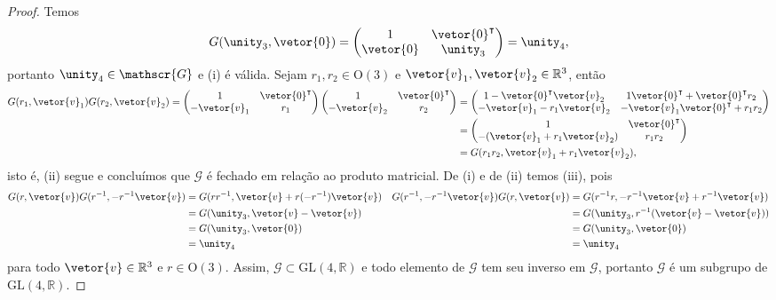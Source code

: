 \begin{proof}
    Temos
    \begin{equation*}
        G(\unity_3, \vetor{0}) = \begin{pmatrix}
            1 & \vetor{0}^\intercal\\
            \vetor{0} & \unity_3
        \end{pmatrix} = \unity_4,
    \end{equation*}
    portanto \(\unity_4 \in \mathscr{G}\) e (i) é válida. Sejam \(r_1, r_2 \in \mathrm{O}(3)\) e \(\vetor{v}_1, \vetor{v}_2 \in \mathbb{R}^3\), então
    \begin{align*}
        G(r_1, \vetor{v}_1)G(r_2, \vetor{v}_2)
        =
        \begin{pmatrix}
            1 & \vetor{0}^\intercal\\
            -\vetor{v}_1 & r_1
        \end{pmatrix}
        \begin{pmatrix}
            1 & \vetor{0}^\intercal\\
            -\vetor{v}_2 & r_2
        \end{pmatrix}
        &=
        \begin{pmatrix}
            1 - \vetor{0}^\intercal\vetor{v}_2 & 1\vetor{0}^\intercal + \vetor{0}^\intercal r_2\\
            -\vetor{v}_1 - r_1 \vetor{v}_2 & -\vetor{v}_1\vetor{0}^\intercal + r_1 r_2
        \end{pmatrix}\\
        &=
        \begin{pmatrix}
            1 & \vetor{0}^\intercal\\
            -(\vetor{v}_1 + r_1 \vetor{v}_2) & r_1 r_2
        \end{pmatrix}\\
        &= G(r_1r_2,\vetor{v}_1 + r_1 \vetor{v}_2),
    \end{align*}
    isto é, (ii) segue e concluímos que \(\mathscr{G}\) é fechado em relação ao produto matricial. De (i) e de (ii) temos (iii), pois
    \begin{align*}
        G(r, \vetor{v})G(r^{-1}, -r^{-1}\vetor{v})
        &= G(r r^{-1}, \vetor{v} + r(-r^{-1})\vetor{v})&
        G(r^{-1}, -r^{-1}\vetor{v})G(r, \vetor{v})
        &= G(r^{-1} r, -r^{-1}\vetor{v} + r^{-1}\vetor{v})\\
        &= G(\unity_3, \vetor{v} - \vetor{v})&
        &= G(\unity_3, r^{-1}(\vetor{v} - \vetor{v}))\\
        &= G(\unity_3, \vetor{0})&
        &= G(\unity_3, \vetor{0})\\
        &= \unity_4&
        &= \unity_4
    \end{align*}
    para todo \(\vetor{v} \in \mathbb{R}^3\) e \(r \in \mathrm{O}(3)\). Assim, \(\mathscr{G}\subset \mathrm{GL}(4, \mathbb{R})\) e todo elemento de \(\mathscr{G}\) tem seu inverso em \(\mathscr{G}\), portanto \(\mathscr{G}\) é um subgrupo de \(\mathrm{GL}(4, \mathbb{R})\).
\end{proof}

